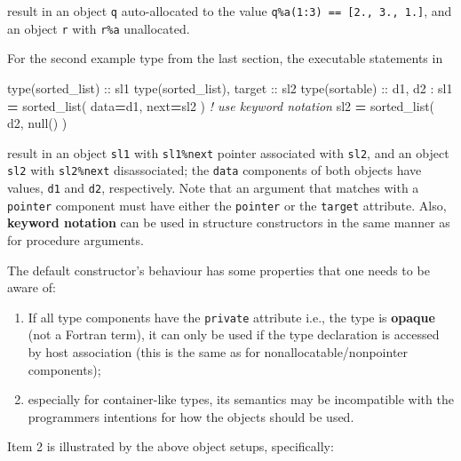 \documentclass[
  paper=a4,
  ,captions=tableheading
]{scrartcl}
\newenvironment{Shaded}{\begin{snugshade}}{\end{snugshade}}
\newcommand{\CommentTok}[1]{\textcolor[rgb]{0.56,0.35,0.01}{\textit{#1}}}
\newcommand{\DataTypeTok}[1]{\textcolor[rgb]{0.13,0.29,0.53}{#1}}
\newcommand{\KeywordTok}[1]{\textcolor[rgb]{0.13,0.29,0.53}{\textbf{#1}}}
\newcommand{\NormalTok}[1]{#1}
\providecommand{\tightlist}{%
  \setlength{\itemsep}{0pt}\setlength{\parskip}{0pt}}
\begin{document}
result in an object \texttt{q} auto-allocated to the value
\texttt{q\%a(1:3)\ ==\ {[}2.,\ 3.,\ 1.{]}}, and an object \texttt{r}
with \texttt{r\%a} unallocated.

For the second example type from the last section, the executable
statements in

\begin{Shaded}
\begin{Highlighting}[]
\DataTypeTok{type(sorted\_list)} \DataTypeTok{::}\NormalTok{ sl1}
\DataTypeTok{type(sorted\_list)}\NormalTok{, }\DataTypeTok{target} \DataTypeTok{::}\NormalTok{ sl2}
\DataTypeTok{type(sortable)} \DataTypeTok{::}\NormalTok{ d1, d2}
\NormalTok{:}
\NormalTok{sl1 }\KeywordTok{=}\NormalTok{ sorted\_list( data}\KeywordTok{=}\NormalTok{d1, next}\KeywordTok{=}\NormalTok{sl2 )  }\CommentTok{! use keyword notation}
\NormalTok{sl2 }\KeywordTok{=}\NormalTok{ sorted\_list( d2, null() )}
\end{Highlighting}
\end{Shaded}

result in an object \texttt{sl1} with \texttt{sl1\%next} pointer
associated with \texttt{sl2}, and an object \texttt{sl2} with
\texttt{sl2\%next} disassociated; the \texttt{data} components of both
objects have values, \texttt{d1} and \texttt{d2}, respectively. Note
that an argument that matches with a \texttt{pointer} component must
have either the \texttt{pointer} or the \texttt{target} attribute. Also,
\textbf{keyword notation} can be used in structure constructors in the
same manner as for procedure arguments.

The default constructor's behaviour has some properties that one needs
to be aware of:

\begin{enumerate}
\def\labelenumi{\arabic{enumi}.}
\tightlist
\item
  If all type components have the \texttt{private} attribute i.e., the
  type is \textbf{opaque} (not a Fortran term), it can only be used if
  the type declaration is accessed by host association (this is the same
  as for nonallocatable/nonpointer components);
\item
  especially for container-like types, its semantics may be incompatible
  with the programmers intentions for how the objects should be used.
\end{enumerate}

Item 2 is illustrated by the above object setups, specifically:
\end{document}
